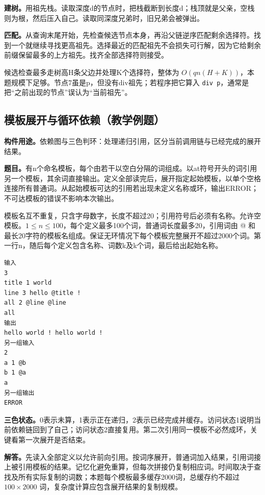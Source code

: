 \noindent\textbf{建树。}用祖先栈。读取深度d的节点时，把栈截断到长度d；栈顶就是父亲，空栈则为根，然后压入自己。读取同深度兄弟时，旧兄弟会被弹出。

\noindent\textbf{匹配。}从查询末尾开始，先检查候选节点本身，再沿父链逆序匹配剩余选择符。找到一个就继续寻找更高祖先。选择最近的匹配祖先不会损失可行解，因为它给剩余前缀保留最多的上方祖先。找齐全部选择符则接受。

候选检查最多走树高H条父边并处理K个选择符，整体为 $O(qn(H+K))$，本题规模下足够。节点7虽是p，但没有div祖先；若程序把它算入 \texttt{div p}，通常是把“之前出现的节点”误认为“当前祖先”。

\subsection{模板展开与循环依赖（教学例题）}
\noindent\textbf{构件用途。}依赖图与三色判环：处理递归引用，区分当前调用链与已经完成的展开结果。


\noindent\textbf{题目。}有n个命名模板，每个由若干以空白分隔的词组成。以at符号开头的词引用另一个模板，其余词直接输出。定义全部读完后，展开指定起始模板，以单个空格连接所有普通词。从起始模板可达的引用若出现未定义名称或环，输出ERROR；不可达模板的错误不影响本次输出。

模板名互不重复，只含字母数字，长度不超过20；引用符号后必须有名称。允许空模板。$1\le n\le100$，每个定义最多100个词，普通词长度最多20，引用词由 @ 和最长20字符的模板名组成。保证无环情况下每个模板完整展开不超过2000个词。第一行n，随后每个定义包含名称、词数k及k个词，最后给出起始名称。
\begin{verbatim}
输入
3
title 1 world
line 3 hello @title !
all 2 @line @line
all
输出
hello world ! hello world !
另一组输入
2
a 1 @b
b 1 @a
a
另一组输出
ERROR
\end{verbatim}

\noindent\textbf{三色状态。}0表示未算，1表示正在递归，2表示已经完成并缓存。访问状态1说明当前依赖链回到了自己；访问状态2直接复用。第二次引用同一模板不必然成环，关键看第一次展开是否结束。

\noindent\textbf{解答。}先读入全部定义以允许前向引用。按词序展开，普通词加入结果，引用词接上被引用模板的结果。记忆化避免重算，但每次拼接仍复制相应词。时间取决于查找及所有实际复制的词数；本题每个模板最多缓存2000词，总缓存约不超过 $100\times2000$ 词，复杂度计算应包含展开结果的复制规模。

